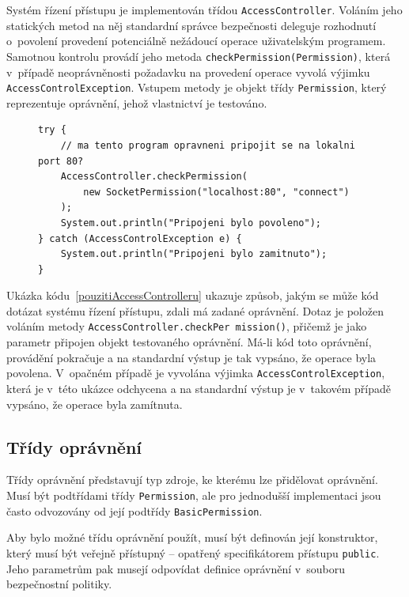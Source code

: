 Systém řízení přístupu je implementován třídou {\tt AccessController}. Voláním jeho statických metod na něj standardní správce bezpečnosti deleguje rozhodnutí o~povolení provedení potenciálně nežádoucí operace uživatelským programem. Samotnou kontrolu provádí jeho metoda {\tt checkPermission(Permission)}, která v~případě neoprávněnosti požadavku na provedení operace vyvolá výjimku {\tt AccessControlException}. Vstupem metody je objekt třídy {\tt Permission}, který reprezentuje oprávnění, jehož vlastnictví je testováno.~\cite{oaks}

\begin{figure}[b!]
\begin{lstlisting}[caption=Příklad položení dotazu systému řízení přístupu~\cite{oaks}, label=pouzitiAccessControlleru]
try {
    // ma tento program opravneni pripojit se na lokalni port 80?
    AccessController.checkPermission(
        new SocketPermission("localhost:80", "connect")
    );
    System.out.println("Pripojeni bylo povoleno");
} catch (AccessControlException e) {
    System.out.println("Pripojeni bylo zamitnuto");
}
\end{lstlisting}
\end{figure}

Ukázka kódu~\ref{pouzitiAccessControlleru} ukazuje způsob, jakým se může kód dotázat systému řízení přístupu, zdali má zadané oprávnění.
Dotaz je položen voláním metody {\tt AccessController.checkPer mission()}, přičemž je jako parametr připojen objekt testovaného oprávnění.
Má-li kód toto oprávnění, provádění pokračuje a na standardní výstup je tak vypsáno, že operace byla povolena.
V~opačném případě je vyvolána výjimka {\tt AccessControlException}, která je v~této ukázce odchycena a na standardní výstup je v~takovém případě vypsáno, že operace byla zamítnuta.

\subsection{Třídy oprávnění}

Třídy oprávnění představují typ zdroje, ke kterému lze přidělovat oprávnění. Musí být podtřídami třídy {\tt Permission}, ale pro jednodušší implementaci jsou často odvozovány od její podtřídy {\tt BasicPermission}.

Aby bylo možné třídu oprávnění použít, musí být definován její konstruktor, který musí být veřejně přístupný -- opatřený specifikátorem přístupu {\tt public}.
Jeho parametrům pak musejí odpovídat definice oprávnění v~souboru bezpečnostní politiky.

